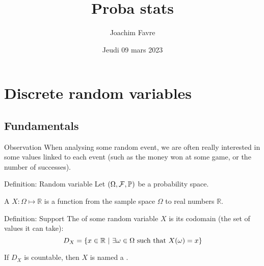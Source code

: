 \documentclass[a4paper]{article}
\title{Proba stats}
\author{Joachim Favre}
\date{Jeudi 09 mars 2023}
\begin{document}
\maketitle


\section{Discrete random variables}
\subsection{Fundamentals}

\begin{parag}{Observation}
    When analysing some random event, we are often really interested in some values linked to each event (such as the money won at some game, or the number of successes).
\end{parag}


\begin{parag}{Definition: Random variable}
    Let $\left(\Omega, \mathcal{F}, \prob\right)$ be a probability space.

    A  $X: \Omega \mapsto \mathbb{R}$ is a function from the sample space $\Omega$ to real numbers $\mathbb{R}$.
\end{parag}

\begin{parag}{Definition: Support}
    The  of some random variable $X$ is its codomain (the set of values it can take): 
    \[D_X = \left\{x \in \mathbb{R} \suchthat \exists \omega \in \Omega \text{ such that } X\left(\omega\right) = x\right\}\]
    
    If $D_X$ is countable, then $X$ is named a .
\end{parag}
\end{document}
